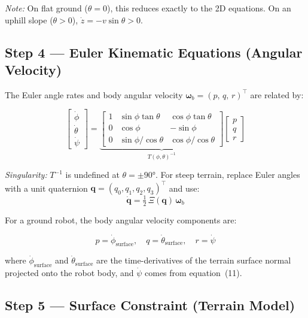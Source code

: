 \documentclass[12pt,a4paper]{article}
\newcommand{\cph}{\cos\phi}
\newcommand{\sph}{\sin\phi}
\newcommand{\cth}{\cos\theta}
\newcommand{\tth}{\tan\theta}
\newcommand{\q}{\mathbf{q}}
\begin{document}
\textit{Note:} On flat ground ($\theta=0$), this reduces exactly to the 2D
equations. On an uphill slope ($\theta>0$), $\dot z = -v\sin\theta > 0$.

\subsection{Step 4 — Euler Kinematic Equations (Angular Velocity)}

The Euler angle rates and body angular velocity
$\bm\omega_b = (p,\,q,\,r)^\top$ are related by:

\begin{equation}
  \begin{bmatrix}\dot\phi\\\dot\theta\\\dot\psi\end{bmatrix}
  =
  \underbrace{
  \begin{bmatrix}
    1 & \sph\tth & \cph\tth \\
    0 & \cph     & -\sph    \\
    0 & \sph/\cth & \cph/\cth
  \end{bmatrix}}_{T(\phi,\theta)^{-1}}
  \begin{bmatrix}p\\q\\r\end{bmatrix}
  \tag{14}
\end{equation}

\textit{Singularity:} $T^{-1}$ is undefined at $\theta = \pm90°$.
For steep terrain, replace Euler angles with a unit quaternion
$\mathbf{q} = (q_0,q_1,q_2,q_3)^\top$ and use:
\[
  \dot{\mathbf{q}} = \tfrac{1}{2}\,\Xi(\mathbf{q})\,\bm\omega_b
\]

For a ground robot, the body angular velocity components are:

\begin{equation}
  p = \dot\phi_{\text{surface}}, \quad
  q = \dot\theta_{\text{surface}}, \quad
  r = \dot\psi
  \tag{15}
\end{equation}

where $\dot\phi_\text{surface}$ and $\dot\theta_\text{surface}$ are the
time-derivatives of the terrain surface normal projected onto the robot body,
and $\dot\psi$ comes from equation~(11).

\subsection{Step 5 — Surface Constraint (Terrain Model)}
\end{document}

